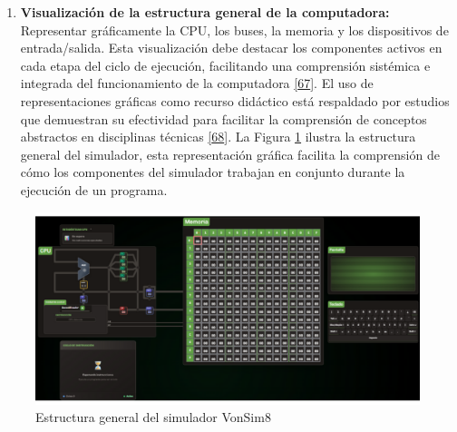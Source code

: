 \documentclass[12pt,oneside]{templates/unerthesis}
\providecommand{\tightlist}{%
  \setlength{\itemsep}{0pt}\setlength{\parskip}{0pt}}
\begin{document}
\begin{enumerate}
\def\labelenumi{\arabic{enumi}.}
\tightlist
\item
  \textbf{Visualización de la estructura general de la computadora:}
  Representar gráficamente la CPU, los buses, la memoria y los dispositivos de entrada/salida. Esta visualización debe destacar los componentes activos en cada etapa del ciclo de ejecución, facilitando una comprensión sistémica e integrada del funcionamiento de la computadora \protect\hyperlink{ref-w3c_accessibility_2021}{{[}67{]}}. El uso de representaciones gráficas como recurso didáctico está respaldado por estudios que demuestran su efectividad para facilitar la comprensión de conceptos abstractos en disciplinas técnicas \protect\hyperlink{ref-sorva2013visualizations}{{[}68{]}}. La Figura \ref{fig:diagramasimulador} ilustra la estructura general del simulador, esta representación gráfica facilita la comprensión de cómo los componentes del simulador trabajan en conjunto durante la ejecución de un programa.
\end{enumerate}

\begin{figure}

\hfill{}\includegraphics[width=0.93\linewidth]{images/estructurasimulador} 

\caption{Estructura general del simulador VonSim8}\label{fig:diagramasimulador}
\end{figure}
\end{document}
